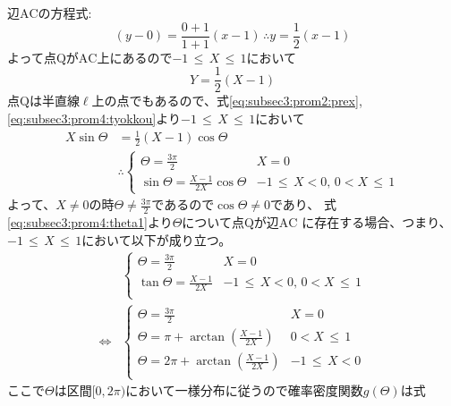 \documentclass[dvipdfmx,titlepage, 11pt, a4paper]{jsarticle}%
\begin{document}
\begin{enumerate}[(1)]
    辺$\mathrm{AC}$の方程式:
    \begin{equation*}
        (y - 0) = \frac{0 + 1}{1 + 1}(x - 1)\, \therefore y = \frac{1}{2}(x - 1)
    \end{equation*}
    よって点$\mathrm{Q}$が$\mathrm{AC}$上にあるので$-1\, \leq\,  X\, \leq \, 1$において
    \begin{equation}
        Y = \frac{1}{2}(X - 1)\label{eq:subsec3:prom4:tyokkou}
    \end{equation}
    点$\mathrm{Q}$は半直線$\ell$上の点でもあるので、式\eqref{eq:subsec3:prom2:prex}, 
    \eqref{eq:subsec3:prom4:tyokkou}より$-1\, \leq\,  X\, \leq \, 1$において
    \begin{align}
        X\sin\Theta &= \frac{1}{2}\left(X - 1\right)\cos\Theta\nonumber\\
        &\therefore
        \begin{cases}
            \Theta = \frac{3\pi}{2} & X = 0\\
            \sin\Theta = \frac{X - 1}{2X}\cos\Theta & -1\, \leq\, X < 0,\, 0 < X\, \leq\, 1
        \end{cases}\label{eq:subsec3:prom4:theta1}
    \end{align}
    よって、$X \neq 0$の時$\Theta \neq \frac{3\pi}{2}$であるので$\cos\Theta \neq 0$であり、
    式\eqref{eq:subsec3:prom4:theta1}より$\Theta$について点$\mathrm{Q}$が辺$\mathrm{AC}$
    に存在する場合、つまり、$-1\, \leq\, X\, \leq\, 1$において以下が成り立つ。
    \begin{align}
        &\begin{cases}
            \Theta = \frac{3\pi}{2} & X = 0\\
            \tan\Theta = \frac{X - 1}{2X} & -1\, \leq\, X < 0,\, 0 < X\, \leq\, 1\\
        \end{cases}\nonumber\\
        \Longleftrightarrow&
        \begin{cases}
            \Theta = \frac{3\pi}{2} & X = 0\\
            \Theta = \pi + \arctan\left(\frac{X - 1}{2X}\right) & 0 < X \, \leq\, 1\\
            \Theta = 2\pi + \arctan\left(\frac{X - 1}{2X}\right) & -1\, \leq\, X < 0\\
        \end{cases}\label{eq:subsec3:prom4:theta2}
    \end{align}
    ここで$\Theta$は区間$[0, 2\pi)$において一様分布に従うので確率密度関数$g(\Theta)$は式

\end{enumerate}
\end{document}
